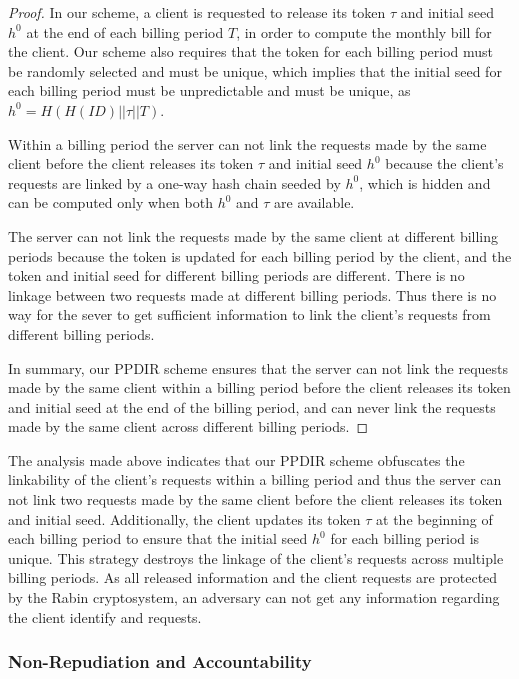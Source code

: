 \documentclass[letterpaper,12pt]{article}
\begin{document}
 \begin{proof} In our scheme, a client is requested to release its token $\tau$ and initial seed $h^0$ at the end of each billing period $T$, in order to compute the monthly bill for the client. Our scheme also requires that the token for each billing period must be randomly selected and must be unique, which implies that the initial seed for each billing period must be unpredictable and must be unique, as $h^0=H(H(ID)||\tau||T)$.

Within a billing period the server can not link the requests made by the same client before the client releases its token $\tau$ and initial seed $h^0$ because the client's requests are linked by a one-way hash chain seeded by $h^0$, which is hidden and can be computed only when both $h^0$ and $\tau$ are available.

The server can not link the requests made by the same client at different billing periods because the token is updated for each billing period by the client, and the token and initial seed for different billing periods are different. There is no linkage between two requests made at different billing periods. Thus there is no way for the sever to get sufficient information to link the client's requests from different billing periods.

In summary, our PPDIR scheme ensures that the server can not link the requests made by the same client within a billing period before the client releases its token and initial seed at the end of the billing period, and can never link the requests made by the same client across different billing periods.
\end{proof}

The analysis made above indicates that our PPDIR scheme obfuscates the linkability of the client's requests within a billing period and thus the server can not link two requests made by the same client before the client releases its token and initial seed. Additionally, the client updates its token $\tau$ at the beginning of each billing period to ensure that the initial seed $h^0$ for each billing period is unique. This strategy destroys the linkage of the client's requests across multiple billing periods. As all released information and the client requests are protected by the Rabin cryptosystem, an adversary can not get any information regarding the client identify and requests.

\subsubsection{Non-Repudiation and Accountability}
\end{document}
